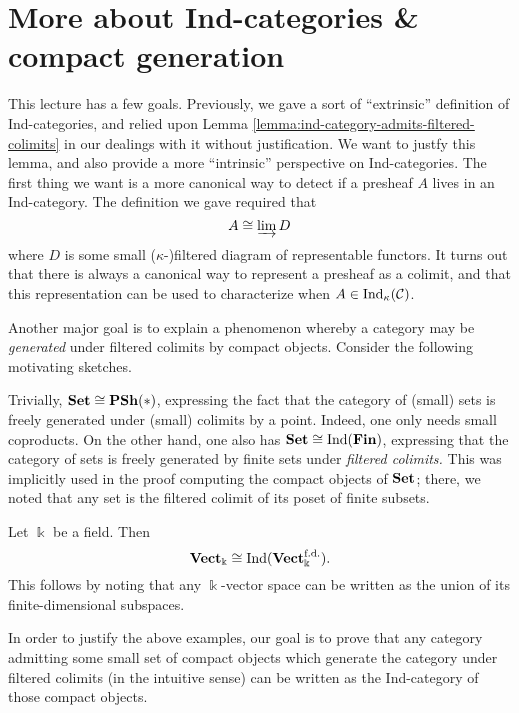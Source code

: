 
\section{More about Ind-categories \& compact generation}
This lecture has a few goals. Previously, we gave a sort of ``extrinsic'' definition of Ind-categories, and relied upon Lemma \ref{lemma:ind-category-admits-filtered-colimits} in our dealings with it without
justification. We want to justfy this lemma, and also provide a more ``intrinsic'' perspective on Ind-categories. The first thing we want is a more canonical way to detect if a presheaf \(A\) lives in an Ind-category.
The definition we gave required that
\[ A \cong \injlim{D} \]
where \(D\) is some small (\(\kappa\)-)filtered diagram of representable functors. It turns out that there is always a canonical way to represent
a presheaf as a colimit, and that this representation can be used to characterize when \(A\in\Ind_\kappa(\calC)\).

Another major goal is to explain a phenomenon whereby a category may be \emph{generated} under filtered colimits by compact objects. Consider the following motivating sketches.
\begin{example}
	Trivially, \(\Set \cong \PSh(*)\), expressing the fact that the category of (small) sets is freely generated under (small) colimits by a point. Indeed, one only needs small coproducts.
	On the other hand, one also has \(\Set \cong \Ind(\cat{Fin})\), expressing that the category of sets is freely generated by finite sets under \emph{filtered colimits.} This was implicitly
	used in the proof computing the compact objects of \(\Set\); there, we noted that any set is the filtered colimit of its poset of finite subsets.
\end{example}
\begin{example}
	Let \(\Bbbk\) be a field. Then
	\[ \Vect_\Bbbk \cong \Ind(\Vect_\Bbbk^\fd). \]
	This follows by noting that any \(\Bbbk\)-vector space can be written as the union of its finite-dimensional subspaces.
\end{example}

In order to justify the above examples, our goal is to prove that any category admitting some small set of compact objects which generate the category under filtered colimits (in
the intuitive sense) can be written as the Ind-category of those compact objects.


